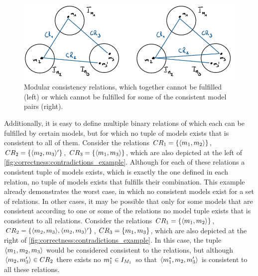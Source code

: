 \begin{figure}
    \centering
    \includegraphics[width=\textwidth]{figures/correctness/notion/contradictions_example.png}
    \caption[Example for incompatible consistency relations]{Modular consistency relations, which together cannot be fulfilled (left) or which cannot be fulfilled for some of the consistent model pairs (right).}
    \label{fig:correctness:contradictions_example}
\end{figure}

Additionally, it is easy to define multiple binary relations of which each can be fulfilled by certain models, but for which no tuple of models exists that is consistent to all of them. Consider the relations $CR_{1} = \{ \langle m_{1}, m_{2} \rangle \}$, $CR_{2} = \{ \langle m_{2}, m_{3} \rangle' \}$, $CR_{3} = \{ \langle m_{1}, m_{3} \rangle \}$, which are also depicted at the left of \autoref{fig:correctness:contradictions_example}.
Although for each of these relations a consistent tuple of models exists, which is exactly the one defined in each relation, no tuple of models exists that fulfills their combination.
This example already demonstrates the worst case, in which no consistent models exist for a set of relations.
In other cases, it may be possible that only for some models that are consistent according to one or some of the relations no model tuple exists that is consistent to all relations.
Consider the relations $CR_{1} = \{ \langle m_{1}, m_{2} \rangle \}$, $CR_{2} = \{ \langle m_{2}, m_{3} \rangle, \langle m_{2}, m_{3} \rangle' \}$, $CR_{3} = \{ m_{1}, m_{3} \}$, which are also depicted at the right of \autoref{fig:correctness:contradictions_example}.
In this case, the tuple $\langle m_{1}, m_{2}, m_{3} \rangle$ would be considered consistent to the relations, but although $\langle m_{2}, m_{3}' \rangle \in CR_{2}$ there exists no $m^*_{1} \in I_{M_{1}}$ so that $\langle m^*_{1}, m_{2}, m_{3}' \rangle$ is consistent to all these relations.

